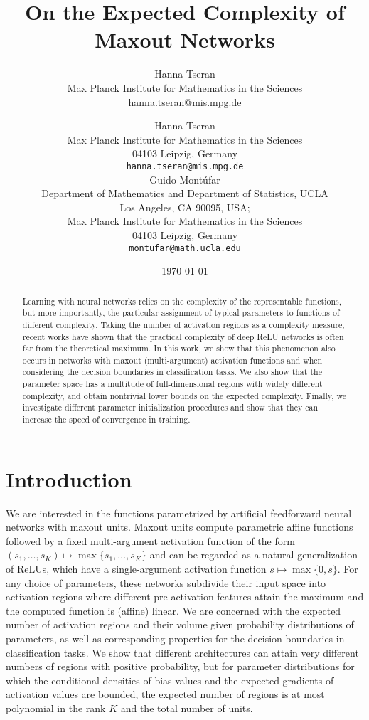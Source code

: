 \documentclass{article}
\date{\today}
\title{On the Expected Complexity of Maxout Networks}
\author{Hanna Tseran\\
Max Planck Institute for Mathematics in the Sciences
\\
hanna.tseran@mis.mpg.de}
\author{
  Hanna Tseran\\
  Max Planck Institute for Mathematics in the Sciences\\
  04103 Leipzig, Germany\\
  \texttt{hanna.tseran@mis.mpg.de}\\
   \And
   Guido Mont\'ufar \\
   Department of Mathematics and Department of Statistics, UCLA\\
   Los Angeles, CA 90095, USA; \\
   Max Planck Institute for Mathematics in the Sciences\\
   04103 Leipzig, Germany \\
   \texttt{montufar@math.ucla.edu} \\
}
\theoremstyle{definition}
\begin{document}
\maketitle

\begin{abstract}
Learning with neural networks relies on the complexity of the representable functions, but more importantly, the particular assignment of typical parameters to functions of different complexity. Taking the number of activation regions as a complexity measure, recent works have shown that the practical complexity of deep ReLU networks is often far from the theoretical maximum. In this work, we show that this phenomenon also occurs in networks with maxout (multi-argument) activation functions and when considering the decision boundaries in classification tasks. We also show that the parameter space has a multitude of full-dimensional regions with widely different complexity, and obtain nontrivial lower bounds on the expected complexity. Finally, we investigate different parameter initialization procedures and show that they can increase the speed of convergence in training. 
\end{abstract}


\section{Introduction}

We are interested in the functions parametrized by artificial feedforward neural networks with maxout units. Maxout units compute parametric affine functions followed by a fixed multi-argument activation function of the form $(s_1,\ldots, s_K)\mapsto \max\{s_1,\ldots, s_K\}$ and can be regarded as a natural generalization of ReLUs, which have a single-argument activation function $s\mapsto \max\{0,s\}$.
For any choice of parameters, these networks subdivide their input space into activation regions where different pre-activation features attain the maximum and the computed function is (affine) linear.
We are concerned with the
expected number of activation regions and their volume given probability distributions of parameters, as well as corresponding properties for the decision boundaries in classification tasks. 
We show that different architectures can attain very different numbers of regions with positive probability, but for
parameter distributions for which the conditional densities of bias values and the expected gradients of activation values are bounded, the expected number of regions is at most polynomial in the rank $K$ and the total number of units.
\end{document}
